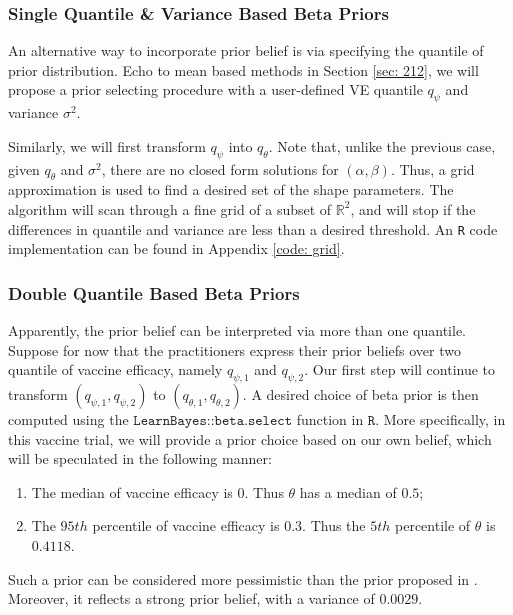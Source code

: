 \documentclass[12pt]{amsart}
\begin{document}
\subsubsection{Single Quantile \& Variance Based Beta Priors}
\label{sec: 213}
An alternative way to incorporate prior belief is via specifying the quantile of prior distribution. Echo to mean based methods in Section \ref{sec: 212}, we will propose a prior selecting procedure with a user-defined VE quantile $q_\psi$ and variance $\sigma^2$. 

Similarly, we will first transform $q_\psi$ into $q_\theta$. Note that, unlike the previous case, given $q_\theta$ and $\sigma^2$, there are no closed form solutions for $(\alpha, \beta)$. Thus, a grid approximation is used to find a desired set of the shape parameters. The algorithm will scan through a fine grid of a subset of $\mathbb{R}^2$, and will stop if the differences in quantile and variance are less than a desired threshold. An \texttt{R} code implementation can be found in Appendix \ref{code: grid}.

\subsubsection{Double Quantile Based Beta Priors} 
\label{sec: 214}

Apparently, the prior belief can be interpreted via more than one quantile. Suppose for now that the practitioners express their prior beliefs over two quantile of vaccine efficacy, namely $q_{\psi, 1}$ and $q_{\psi, 2}$. Our first step will continue to transform $(q_{\psi, 1}, q_{\psi, 2})$ to $(q_{\theta, 1}, q_{\theta, 2})$. A desired choice of beta prior is then computed using
the $\texttt{LearnBayes::beta.select}$ function in $\texttt{R}$. More specifically, in this vaccine trial, we will provide a prior choice based on our own belief, which will be speculated in the following manner: 
\begin{enumerate}
  \item The median of vaccine efficacy is $0$. Thus $\theta$ has a median of $0.5$;
  \item The $95th$ percentile of vaccine efficacy is $0.3$. Thus the $5th$ percentile of $\theta$ is $0.4118$.
\end{enumerate}
Such a prior can be considered more pessimistic than the prior proposed in \cite{paper}. Moreover, it reflects a strong prior belief, with a variance of $0.0029$.
\end{document}
